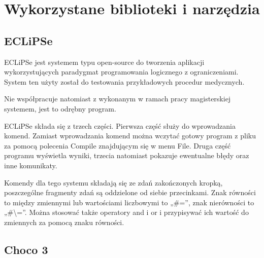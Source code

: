 \chapter{Wykorzystane biblioteki i narzędzia}

\section{ECLiPSe}

ECLiPSe\cite{EclipseSite} jest systemem typu open-source do tworzenia aplikacji wykorzystujących paradygmat programowania logicznego z ograniczeniami. System ten użyty został do testowania przykładowych procedur medycznych. 

Nie współpracuje natomiast z wykonanym w ramach pracy magisterskiej systemem, jest to odrębny program. 

ECLiPSe składa się z trzech części. Pierwsza część służy do wprowadzania komend. Zamiast wprowadzania komend można wczytać gotowy program z pliku za pomocą polecenia Compile znajdującym się w menu File. Druga część programu wyświetla wyniki, trzecia natomiast pokazuje ewentualne błędy oraz inne komunikaty. 

Komendy dla tego systemu składają się ze zdań zakończonych kropką, poszczególne fragmenty zdań są oddzielone od siebie przecinkami. Znak równości to między zmiennymi lub wartościami liczbowymi to „\#=”, znak nierówności to „\#\textbackslash=”. Można stosować także operatory and i or i przypisywać ich wartość do zmiennych za pomocą znaku równości. 

\section{Choco 3}


